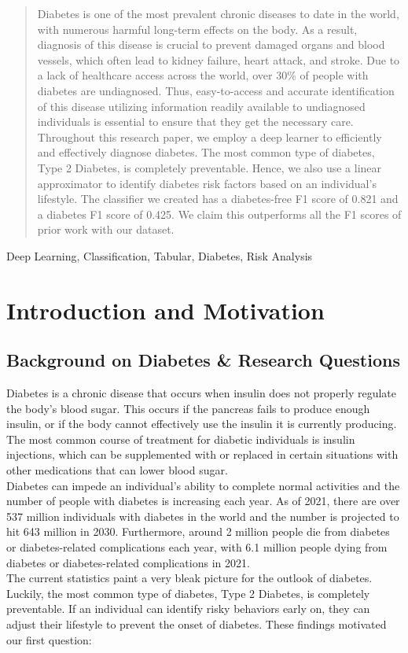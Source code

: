 \documentclass[conference]{IEEEtran}
\begin{document}
\begin{abstract}
Diabetes is one of the most prevalent chronic diseases to date in the world, with numerous harmful long-term effects on the body. As a result, diagnosis of this disease is crucial to prevent damaged organs and blood vessels, which often lead to kidney failure, heart attack, and stroke. Due to a lack of healthcare access across the world, over 30\% of people with diabetes are undiagnosed.  Thus, easy-to-access and accurate identification of this disease utilizing information readily available to undiagnosed individuals is essential to ensure that they get the necessary care. Throughout this research paper, we employ a deep learner to efficiently and effectively diagnose diabetes. The most common type of diabetes, Type 2 Diabetes, is completely preventable. Hence, we also use a linear approximator to identify diabetes risk factors based on an individual’s lifestyle. The classifier we created has a diabetes-free F1 score of 0.821 and a diabetes F1 score of 0.425. We claim this outperforms all the F1 scores of prior work with our dataset. \\
\end{abstract}

\begin{IEEEkeywords}
Deep Learning, Classification, Tabular, Diabetes, Risk Analysis
\end{IEEEkeywords}

\section{Introduction and Motivation}\label{sec:intro}
    \subsection{Background on Diabetes \& Research Questions}
Diabetes is a chronic disease that occurs when insulin does not properly regulate the body’s blood sugar. This occurs if the pancreas fails to produce enough insulin, or if the body cannot effectively use the insulin it is currently producing. The most common course of treatment for diabetic individuals is insulin injections, which can be supplemented with or replaced in certain situations with other medications that can lower blood sugar\cite{b2}. \\
\indent Diabetes can impede an individual’s ability to complete normal activities and the number of people with diabetes is increasing each year. As of 2021, there are over 537 million individuals with diabetes in the world and the number is projected to hit 643 million in 2030\cite{b4}. Furthermore, around 2 million people die from diabetes or diabetes-related complications each year\cite{b2}, with 6.1 million people dying from diabetes or diabetes-related complications in 2021\cite{b4}. \\
\indent The current statistics paint a very bleak picture for the outlook of diabetes. Luckily, the most common type of diabetes, Type 2 Diabetes, is completely preventable. If an individual can identify risky behaviors early on, they can adjust their lifestyle to prevent the onset of diabetes. These findings motivated our first question:
\end{document}
